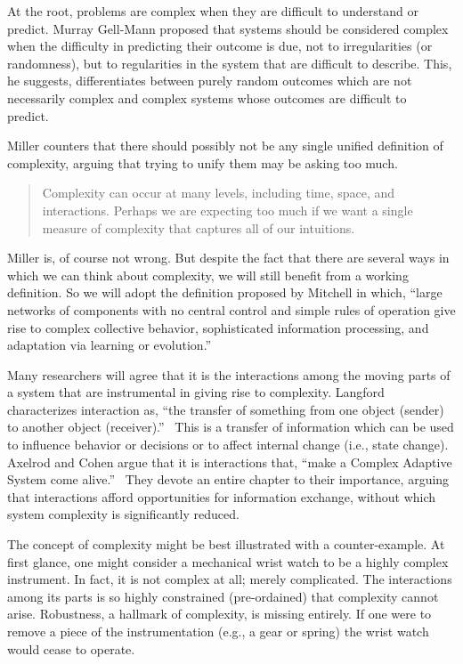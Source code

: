 \documentclass[jou,apacite]{apa6}
\begin{document}
At the root, problems are complex when they are difficult to understand or predict.  Murray Gell-Mann proposed that systems should be considered complex when the difficulty in predicting their outcome is due, not to irregularities (or randomness), but to regularities in the system that are difficult to describe.  This, he suggests, differentiates between purely random outcomes which are not necessarily complex and complex systems whose outcomes are difficult to
predict.~\cite{GellMann}

Miller counters that there should possibly not be any single unified definition of complexity, arguing that trying to unify them may be asking too much.
\begin{quotation}
  Complexity can occur at many levels, including time, space, and interactions.  Perhaps we are expecting too much if we want a single measure of complexity that captures all of our intuitions.~\cite[page 234]{Miller}
\end{quotation}

Miller is, of course not wrong.  But despite the fact that there are several ways in which we can think about complexity, we will still benefit from a working definition.  So we will adopt the definition proposed by Mitchell in which, ``large networks of components with no central control and simple rules of operation give rise to complex collective behavior, sophisticated information processing, and adaptation via learning or evolution.''~\cite[page 13]{Mitchell}

Many researchers will agree that it is the interactions among the moving parts of a system that are instrumental in giving rise to complexity.  Langford characterizes interaction as, ``the transfer of something from one object (sender) to another object (receiver).''~\cite[page 48]{Langford}  This is a transfer of information which can be used to influence behavior or decisions or to affect internal change (i.e., state change).  Axelrod and Cohen argue that it is interactions that, ``make a Complex Adaptive System come alive.''~\cite[page 63]{Axelrod} They devote an entire chapter to their importance, arguing that interactions afford opportunities for information exchange, without which system complexity is significantly reduced.  

The concept of complexity might be best illustrated with a counter-example.  At first glance, one might consider a mechanical wrist watch to be a highly complex instrument.  In fact, it is not complex at all; merely complicated.  The interactions among its parts is so highly constrained (pre-ordained) that complexity cannot arise.  Robustness, a hallmark of complexity, is missing entirely.  If one were to remove a piece of the instrumentation (e.g., a gear or spring) the wrist watch
would cease to operate.
\end{document}
